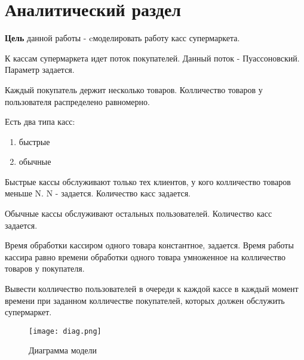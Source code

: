 \chapter{Аналитический раздел}

\textbf{Цель} данной работы - cмоделировать работу касс супермаркета. 

К кассам супермаркета идет поток покупателей. Данный поток - Пуассоновский. Параметр задается.

Каждый покупатель держит несколько товаров. Колличество товаров у пользователя распределено равномерно. 

Есть два типа касс:
\begin{enumerate}
	\item быстрые
	\item обычные
\end{enumerate}

Быстрые кассы обслуживают только тех клиентов, у кого колличество товаров меньше N. N - задается. Количество касс задается.

Обычные кассы обслуживают остальных пользователей. Количество касс задается.

Время обработки кассиром одного товара константное, задается. Время работы кассира равно времени обработки одного товара умноженное на колличество товаров у покупателя.

Вывести колличество пользователей в очереди к каждой кассе в каждый момент времени при заданном колличестве покупателей, которых должен обслужить супермаркет.

\begin{figure}
  \centering
  \texttt{[image: diag.png]}
  \caption{Диаграмма модели}
\end{figure}